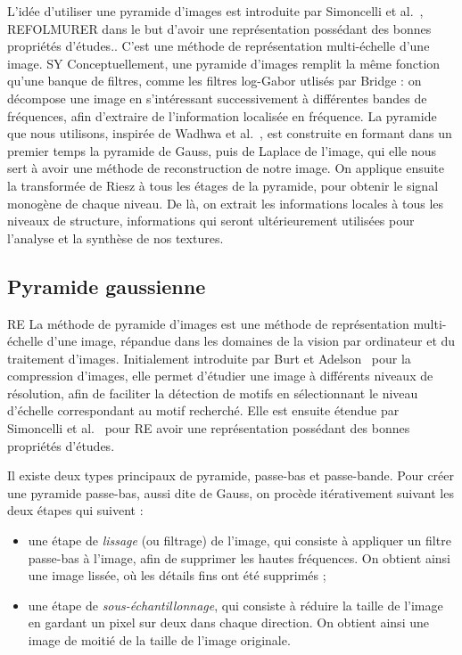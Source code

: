 L'idée d'utiliser une pyramide d'images est introduite par Simoncelli et al.~\cite{simoncelli_shiftable_1992}, {\color{red}REFOLMURER dans le but d'avoir une représentation possédant des bonnes propriétés d'études.}. C'est une méthode de représentation multi-échelle d'une image.
SY Conceptuellement, une pyramide d'images remplit la même fonction qu'une banque de filtres, comme les filtres log-Gabor utlisés par Bridge : on décompose une image en s'intéressant successivement à différentes bandes de fréquences, afin d'extraire de l'information localisée en fréquence. La pyramide que nous utilisons, inspirée de Wadhwa et al.~\cite{wadhwa_phase_based_2013}, est construite en formant dans un premier temps la pyramide de Gauss, puis de Laplace de l'image, qui elle nous sert à avoir une méthode de reconstruction de notre image. On applique ensuite la transformée de Riesz à tous les étages de la pyramide, pour obtenir le signal monogène de chaque niveau. De là, on extrait les informations locales à tous les niveaux de structure, informations qui seront ultérieurement utilisées pour l'analyse et la synthèse de nos textures.

\subsection{Pyramide gaussienne}

RE La méthode de pyramide d'images est une méthode de représentation multi-échelle d'une image, répandue dans les domaines de la vision par ordinateur et du traitement d'images. Initialement introduite par Burt et Adelson~\cite{burt_laplacian_1983} pour la compression d'images, elle permet d'étudier une image à différents niveaux de résolution, afin de faciliter la détection de motifs en sélectionnant le niveau d'échelle correspondant au motif recherché. Elle est ensuite étendue par Simoncelli et al.~\cite{simoncelli_shiftable_1992} pour RE avoir une représentation possédant des bonnes propriétés d'études.

Il existe deux types principaux de pyramide, passe-bas et passe-bande. Pour créer une pyramide passe-bas, aussi dite de Gauss, on procède itérativement suivant les deux étapes qui suivent :

\begin{itemize}
    \item une étape de \textit{lissage} (ou filtrage) de l'image, qui consiste à appliquer un filtre passe-bas à l'image, afin de supprimer les hautes fréquences. On obtient ainsi une image lissée, où les détails fins ont été supprimés ;
    \item une étape de \textit{sous-échantillonnage}, qui consiste à réduire la taille de l'image en gardant un pixel sur deux dans chaque direction. On obtient ainsi une image de moitié de la taille de l'image originale.
\end{itemize}


